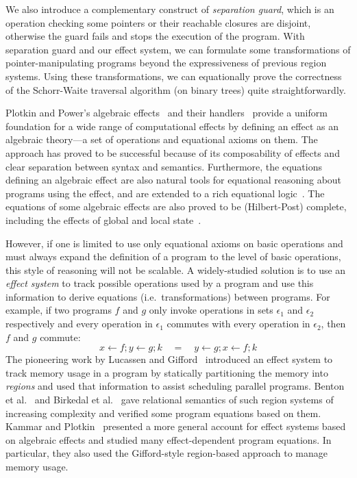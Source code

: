 \documentclass[runningheads]{llncs}
\begin{document}
{\begin{enumerate}
    We also introduce a complementary construct of \emph{separation guard}, which is an operation checking some pointers or their reachable closures are disjoint, otherwise the guard fails and stops the execution of the program.
    With separation guard and our effect system, we can formulate some transformations of pointer-manipulating programs beyond the expressiveness of previous region systems.
    Using these transformations, we can equationally prove the correctness of the Schorr-Waite traversal algorithm (on binary trees) quite straightforwardly.
\end{enumerate}
}

Plotkin and Power's algebraic effects~\cite{Plotkin2002,Plotkin2004} and their handlers~\cite{Plotkin2013,Pretnar2010} provide a uniform foundation for a wide range of computational effects by defining an effect as an algebraic theory---a set of operations and equational axioms on them.
The approach has proved to be successful because of its composability of effects and clear separation between syntax and semantics.
Furthermore, the equations defining an algebraic effect are also natural tools for equational reasoning about programs using the effect, and are extended to a rich equational logic~\cite{Pretnar2010,Plotkin2008}.
The equations of some algebraic effects are also proved to be (Hilbert-Post) complete, including the effects of global and local state~\cite{Staton2010}.


However, if one is limited to use only equational axioms on basic operations and must always expand the definition of a program to the level of basic operations, this style of reasoning will not be scalable.
A widely-studied solution is to use an \emph{effect system} to track possible operations used by a program and use this information to derive equations (i.e.\ transformations) between programs.
For example, if two programs $f$ and $g$ only invoke operations in sets $\epsilon_1$ and $\epsilon_2$ respectively and every operation in $\epsilon_1$ commutes with every operation in $\epsilon_2$, then $f$ and $g$ commute:
\[x \leftarrow f; y \leftarrow g; k \quad = \quad y \leftarrow g; x \leftarrow f; k\]
The pioneering work by Lucassen and Gifford~\cite{Lucassen1988} introduced an effect system to track memory usage in a program by statically partitioning the memory into \emph{regions} and used that information to assist scheduling parallel programs.
Benton et al.~\cite{Benton2006,Benton2007,Benton2009} and Birkedal et al.~\cite{Birkedal2016} gave relational semantics of such region systems of increasing complexity and verified some program equations based on them.
Kammar and Plotkin~\cite{Kammar2012} presented a more general account for effect systems based on algebraic effects and studied many effect-dependent program equations.
In particular, they also used the Gifford-style region-based approach to manage memory usage.
\end{document}
